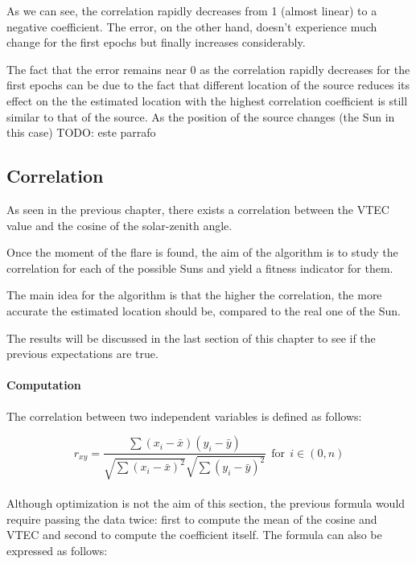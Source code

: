 As we can see, the correlation rapidly decreases from 1 (almost linear) to a negative coefficient. The error, on the other hand, doesn't experience much change for the first epochs but finally increases considerably. 

The fact that the error remains near 0 as the correlation rapidly decreases for the first epochs can be due to the fact that different location of the source reduces its effect on the  the estimated location with the highest correlation coefficient is still similar to that of the source. As the position of the source changes (the Sun in this case)  TODO: este parrafo

\subsection{Correlation}

As seen in the previous chapter, there exists a correlation between the VTEC value and the cosine of the solar-zenith angle. 

Once the moment of the flare is found, the aim of the algorithm is to study the correlation for each of the possible Suns and yield a fitness indicator for them. 

The main idea for the algorithm is that the higher the correlation, the more accurate the estimated location should be, compared to the real one of the Sun. 

The results will be discussed in the last section of this chapter to see if the previous expectations are true.

\paragraph{Computation}

The correlation between two independent variables is defined as follows:

\begin{equation} \label{eq:coefficient}
r_{xy} = \frac{\sum(x_{i} - \bar{x})(y_{i} - \bar{y})}
{\sqrt{\sum(x_{i} - \bar{x})^{2}}
	\sqrt{\sum(y_{i} - \bar{y})^{2}}} \ \ \text{for} \ \ i \in (0, n)
\end{equation} \\

Although optimization is not the aim of this section, the previous formula would require passing the data twice: first to compute the mean of the cosine and VTEC and second to compute the coefficient itself. The formula can also be expressed as follows:

